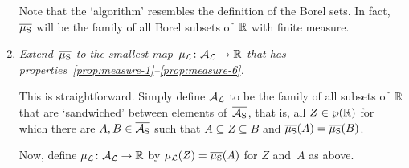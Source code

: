 \documentclass[main.tex]{subfiles}
\begin{document}
\begin{enumerate}
Note that the `algorithm' resembles the  definition
of the Borel sets.
In fact, $\overline{\mu_{\mathrm{S}}}$
will be the family of all Borel subsets of~$\mathbb{R}$
with finite measure.


\item
\label{extension-step-3}
\emph{Extend~$\overline{\mu_{\mathrm{S}}}$
to the smallest map~$\mu_{\mathcal{L}}\colon \mathcal{A}_{\mathcal{L}} \rightarrow \mathbb{R}$
that has properties~\ref{prop:measure-1}--\ref{prop:measure-6}.}

This is straightforward.
Simply
define $\mathcal{A}_{\mathcal{L}}$ to be the family of all subsets of~$\mathbb{R}$
that are `sandwiched' between elements of~$\overline{\mathcal{A}_{\mathrm{S}}}$,
that is,
all $Z\in\wp(\mathbb{R})$
for which
there are $A,B\in \overline{\mathcal{A}_{\mathrm{S}}}$
such that $A\subseteq Z\subseteq B$ and 
$\overline{\mu_{\mathrm{S}}}(A) = \overline{\mu_{\mathrm{S}}}(B)$.

Now, define $\mu_{\mathcal{L}}\colon \mathcal{A}_{\mathcal{L}} \rightarrow \mathbb{R}$
by $\mu_{\mathcal{L}} (Z) = \overline{\mu_{\mathrm{S}}} (A)$ for $Z$ and~$A$ as above.
\end{enumerate}
\end{document}
